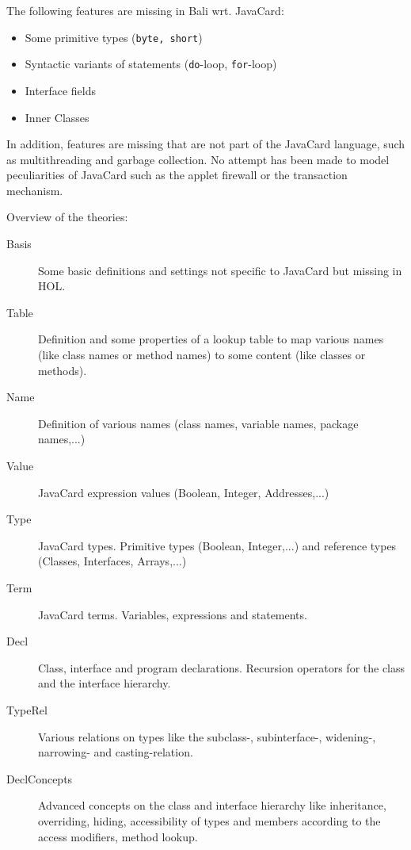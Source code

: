 \documentclass[11pt,a4paper]{book}
\begin{document}
The following features are missing in Bali wrt.{} JavaCard:
\begin{itemize}
\item Some primitive types (\texttt{byte, short})
\item Syntactic variants of statements
  (\texttt{do}-loop, \texttt{for}-loop)
\item Interface fields
\item Inner Classes
\end{itemize}

In addition, features are missing that are not part of the JavaCard
language, such as multithreading and garbage collection. No attempt
has been made to model peculiarities of JavaCard such as the applet
firewall or the transaction mechanism.


Overview of the theories:
\begin{description}
\item[Basis] 
Some basic definitions and settings not specific to JavaCard but missing in HOL.

\item[Table]
Definition and some properties of a lookup table to map various names 
(like class names or method names) to some content (like classes or methods).

\item[Name]
Definition of various names (class names, variable names, package names,...)

\item[Value]
JavaCard expression values (Boolean, Integer, Addresses,...)

\item[Type]
JavaCard types. Primitive types (Boolean, Integer,...) and reference types 
(Classes, Interfaces, Arrays,...)

\item[Term]
JavaCard terms. Variables, expressions and statements.

\item[Decl]
Class, interface and program declarations. Recursion operators for the
class and the interface hierarchy. 

\item[TypeRel]
Various relations on types like the subclass-, subinterface-, widening-, 
narrowing- and casting-relation.

\item[DeclConcepts]
Advanced concepts on the class and interface hierarchy like inheritance, 
overriding, hiding, accessibility of types and members according to the access 
modifiers, method lookup.


\end{description}
\end{document}
